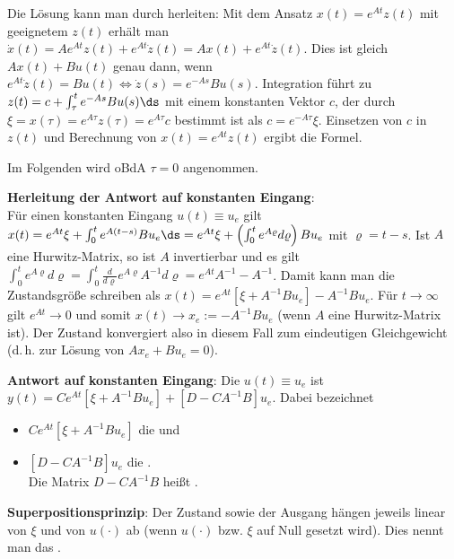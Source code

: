 Die Lösung kann man durch  herleiten:
Mit dem Ansatz $x(t) = e^{At} z(t)$ mit geeignetem $z(t)$
erhält man $\dot{x}(t) = A e^{At} z(t) + e^{At} \dot{z}(t) = Ax(t) + e^{At} \dot{z}(t)$.
Dies ist gleich $Ax(t) + Bu(t)$ genau dann, wenn $e^{At} \dot{z}(t) = Bu(t) \iff
\dot{z}(s) = e^{-As} Bu(s)$.
Integration führt zu $z(t) = c + \int_\tau^t e^{-As} Bu(s) \ds$ mit einem konstanten Vektor $c$,
der durch $\xi = x(\tau) = e^{A\tau} z(\tau) = e^{A\tau} c$ bestimmt ist als
$c = e^{-A\tau} \xi$.
Einsetzen von $c$ in $z(t)$ und Berechnung von $x(t) = e^{At} z(t)$ ergibt die Formel.

\linie

Im Folgenden wird oBdA $\tau = 0$ angenommen.

\textbf{Herleitung der Antwort auf konstanten Eingang}:\\
Für einen konstanten Eingang $u(t) \equiv u_e$ gilt\\
$x(t) = e^{At} \xi + \int_0^t e^{A(t - s)} B u_e \ds =
e^{At} \xi + \left(\int_0^t e^{A\varrho} d\varrho\right) B u_e$ mit $\varrho = t - s$.
Ist $A$ eine Hurwitz-Matrix, so ist $A$ invertierbar und es gilt
$\int_0^t e^{A\varrho} d\varrho = \int_0^t \frac{d}{d\varrho} e^{A\varrho} A^{-1} d\varrho
= e^{At} A^{-1} - A^{-1}$.
Damit kann man die Zustandsgröße schreiben als
$x(t) = e^{At} [\xi + A^{-1} B u_e] - A^{-1} B u_e$.
Für $t \to \infty$ gilt $e^{At} \to 0$ und somit
$x(t) \to x_e := -A^{-1} B u_e$
(wenn $A$ eine Hurwitz-Matrix ist).
Der Zustand konvergiert also in diesem Fall zum eindeutigen Gleichgewicht
(d.\,h. zur Lösung von $Ax_e + Bu_e = 0$).

\textbf{Antwort auf konstanten Eingang}:
Die  $u(t) \equiv u_e$ ist\\
$y(t) = Ce^{At} [\xi + A^{-1} B u_e] + [D - CA^{-1}B] u_e$.
Dabei bezeichnet
\begin{itemize}
    \item
    $Ce^{At} [\xi + A^{-1} B u_e]$ die  und
    
    \item
    $[D - CA^{-1} B] u_e$ die .\\
    Die Matrix $D - CA^{-1}B$ heißt
    .
\end{itemize}

\linie

\textbf{Superpositionsprinzip}:
Der Zustand sowie der Ausgang hängen jeweils linear von $\xi$ und von $u(\cdot)$ ab
(wenn $u(\cdot)$ bzw. $\xi$ auf Null gesetzt wird).
Dies nennt man das .

